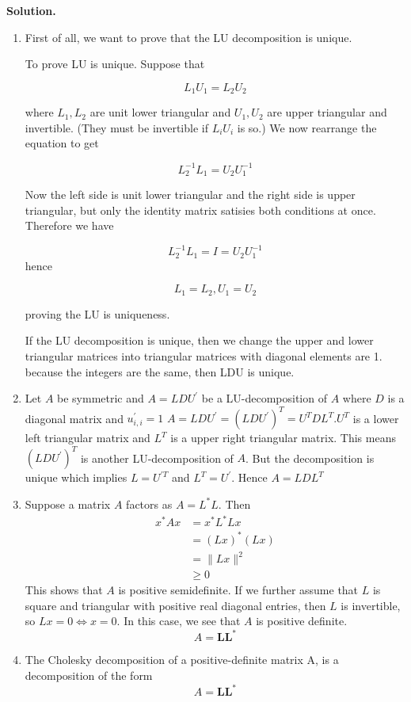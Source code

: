 \documentclass[english,onecolumn]{IEEEtran}
\begin{document}
\noindent\textbf{Solution.}
\begin{enumerate}
    \item First of all, we want to prove that the LU decomposition is unique. 
    
    To prove LU is unique. Suppose that
    
    $$
    L_{1} U_{1}=L_{2} U_{2}
    $$
    
    where $L_{1}, L_{2}$ are unit lower triangular and $U_{1}, U_{2}$ are upper triangular and invertible. (They must be invertible if $L_{i} U_{i}$ is so.) We now rearrange the equation to get
    
    $$L_{2}^{-1} L_{1}=U_{2} U_{1}^{-1}$$
    
    Now the left side is unit lower triangular and the right side is upper triangular, but only the identity matrix satisies both conditions at once. Therefore we have
    
    $$L_{2}^{-1} L_{1}=I=U_{2} U_{1}^{-1}$$
    hence
    
    $$L_{1}=L_{2}, U_{1}=U_{2}$$
    
    proving the LU is uniqueness.
    
     If the LU decomposition is unique, then we change the upper and lower triangular matrices into triangular matrices with  diagonal elements are 1. because the integers are the same, then LDU is unique.
     
     \item Let $A$ be symmetric and $A=L D U^{\prime}$ be a LU-decomposition of $A$ where $D$ is a diagonal matrix and $u_{i, i}^{\prime}=1$
     $A=L D U^{\prime}=\left(L D U^{\prime}\right)^{T}=U^{T} D L^{T} . U^{T}$ is a lower left triangular matrix and $L^{T}$ is a upper right triangular matrix. This means $\left(L D U^{\prime}\right)^{T}$ is another LU-decomposition of $A$. But the decomposition is unique which implies $L=U^{\prime T}$ and $L^{T}=U^{\prime} .$ Hence $A=L D L^{T}$
     \item
    Suppose a matrix $A$ factors as $A=L^{*} L .$ Then
    $$
    \begin{aligned}
    	x^{*} A x &=x^{*} L^{*} L x \\
    	&=(L x)^{*}(L x) \\
    	&=\|L x\|^{2} \\
    	& \geq 0
    \end{aligned}
    $$
    This shows that $A$ is positive semidefinite.
    If we further assume that $L$ is square and triangular with positive real diagonal entries, then $L$ is invertible, so $L x=0 \Longleftrightarrow x=0 .$ In this case, we see that $A$ is positive definite.
     $$
     A=\mathbf{L}\mathbf{L}^*
     $$
    \item 
    The Cholesky decomposition of a positive-definite matrix A, is a decomposition of the form
    $$
    A=\mathbf{L}\mathbf{L}^*
    $$
    

\end{enumerate}
\end{document}
